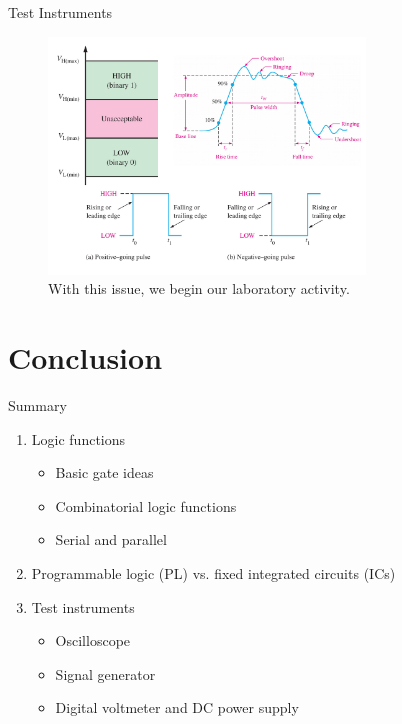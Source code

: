 \documentclass{beamer}
\begin{document}
\begin{frame}{Test Instruments}
\begin{figure}
\includegraphics[width=0.75\textwidth]{digital1.pdf}
\caption{\label{fig:digital1_2} With this issue, we begin our laboratory activity.}
\end{figure}
\end{frame}

\section{Conclusion}

\begin{frame}{Summary}
\begin{enumerate}
\item Logic functions
\begin{itemize}
\item Basic gate ideas
\item Combinatorial logic functions
\item Serial and parallel
\end{itemize}
\item Programmable logic (PL) vs. fixed integrated circuits (ICs)
\item Test instruments
\begin{itemize}
\item Oscilloscope
\item Signal generator
\item Digital voltmeter and DC power supply
\end{itemize}
\end{enumerate}
\end{frame}
\end{document}
